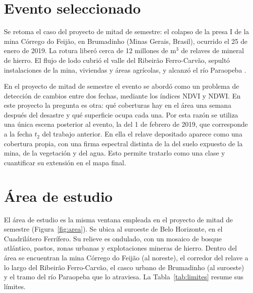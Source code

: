 \documentclass{article}
\begin{document}
\section{Evento seleccionado}
Se retoma el caso del proyecto de mitad de semestre: el colapso de la presa I de la mina Córrego do Feijão, en Brumadinho (Minas Gerais, Brasil), ocurrido el 25 de enero de 2019. La rotura liberó cerca de 12 millones de m$^3$ de relaves de mineral de hierro. El flujo de lodo cubrió el valle del Ribeirão Ferro-Carvão, sepultó instalaciones de la mina, viviendas y áreas agrícolas, y alcanzó el río Paraopeba \parencite{Rotta2020}.

En el proyecto de mitad de semestre el evento se abordó como un problema de detección de cambios entre dos fechas, mediante los índices NDVI y NDWI. En este proyecto la pregunta es otra: qué coberturas hay en el área una semana después del desastre y qué superficie ocupa cada una. Por esta razón se utiliza una única escena posterior al evento, la del 1 de febrero de 2019, que corresponde a la fecha $t_2$ del trabajo anterior. En ella el relave depositado aparece como una cobertura propia, con una firma espectral distinta de la del suelo expuesto de la mina, de la vegetación y del agua. Esto permite tratarlo como una clase y cuantificar su extensión en el mapa final.

\section{Área de estudio}
El área de estudio es la misma ventana empleada en el proyecto de mitad de semestre (Figura~\ref{fig:area}). Se ubica al suroeste de Belo Horizonte, en el Cuadrilátero Ferrífero. Su relieve es ondulado, con un mosaico de bosque atlántico, pastos, zonas urbanas y explotaciones mineras de hierro. Dentro del área se encuentran la mina Córrego do Feijão (al noreste), el corredor del relave a lo largo del Ribeirão Ferro-Carvão, el casco urbano de Brumadinho (al suroeste) y el tramo del río Paraopeba que lo atraviesa. La Tabla~\ref{tab:limites} resume sus límites.
\end{document}
